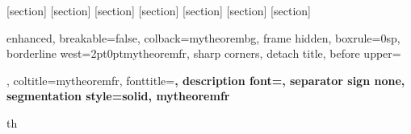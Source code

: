 

\usepackage{amsmath,amsfonts,amsthm,amssymb,mathtools}

\usepackage{enumitem}
\usepackage[most,many,breakable]{tcolorbox}
\usepackage{xcolor}
\usepackage{pgfplots}
\pgfplotsset{compat=1.18}
\usetikzlibrary{intersections}
\usepackage{pgfplotstable}
\usetikzlibrary{calc}
\usetikzlibrary{positioning}
\usetikzlibrary{shapes.geometric} 
\usetikzlibrary{arrows,fit}
\usepackage{pgf-pie}



\usepackage{tikz-cd}
\usepackage{cancel}
\usepackage{array}
\usepackage{multirow}     %
\usepackage{graphicx}     %
\usepackage{rotating}     %


\renewcommand{\subsubsection}[1]{%
  \vspace{0.5em}
  \textbf{\large #1}\mbox{}\\
  \vspace{0.5em}}

\newcommand{\mc}[1]{\mathcal{#1}}



[section]
[section]
[section]
[section]
[section]
[section]
[section]

{enhanced, breakable=false, colback=mytheorembg, frame hidden, boxrule=0sp,
  borderline west={2pt}{0pt}{mytheoremfr}, sharp corners, detach title,
  before upper={\renewcommand{\familydefault}{\sfdefault}\selectfont\tcbtitle\par\smallskip},
  coltitle=mytheoremfr, fonttitle=\bfseries\sffamily, description font=\mdseries,
  separator sign none, segmentation style={solid, mytheoremfr}}{th}

